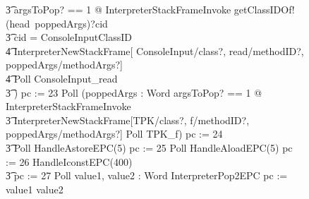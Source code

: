 \begin{figure}[tp!]
{\begin{circus}
    \t3 \lschexpract \exists argsToPop?  == 1 @ InterpreterStackFrameInvoke \rschexpract \circseq getClassIDOf!(head~poppedArgs)?cid \then {} \\
    \t3 \circif cid = ConsoleInputClassID \circthen {} \\
    \t4 \lschexpract InterpreterNewStackFrame[ ConsoleInput/class?, read/methodID?, poppedArgs/methodArgs?] \rschexpract \circseq \\
    \t4 Poll \circseq ConsoleInput\_read \\
    \t3 \circfi) \circseq pc := 23 \circseq Poll \circseq (\circvar poppedArgs : \seq Word \circspot \lschexpract \exists argsToPop? == 1 @ InterpreterStackFrameInvoke \rschexpract \circseq \\
    \t3 \lschexpract InterpreterNewStackFrame[TPK/class?, f/methodID?, poppedArgs/methodArgs?] \rschexpract \circseq Poll \circseq TPK\_f) \circseq pc := 24 \circseq \\
    \t3 Poll \circseq HandleAstoreEPC(5) \circseq pc := 25 \circseq Poll \circseq HandleAloadEPC(5) \circseq pc := 26 \circseq HandleIconstEPC(400) \circseq \\
    \t3 pc := 27 \circseq Poll \circseq \circvar value1, value2 : Word \circspot InterpreterPop2EPC \circseq pc := \IF value1 \leq value2   \\

\end{circus}}
\end{figure}
